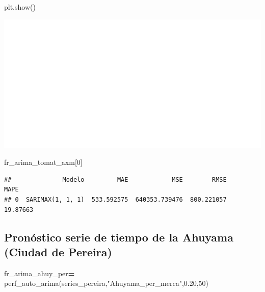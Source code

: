 \documentclass[
]{book}
\newenvironment{Shaded}{\begin{snugshade}}{\end{snugshade}}
\newcommand{\DecValTok}[1]{\textcolor[rgb]{0.00,0.00,0.81}{#1}}
\newcommand{\FloatTok}[1]{\textcolor[rgb]{0.00,0.00,0.81}{#1}}
\newcommand{\NormalTok}[1]{#1}
\newcommand{\OperatorTok}[1]{\textcolor[rgb]{0.81,0.36,0.00}{\textbf{#1}}}
\newcommand{\StringTok}[1]{\textcolor[rgb]{0.31,0.60,0.02}{#1}}
\begin{document}
\begin{Shaded}
\begin{Highlighting}[]
\NormalTok{plt.show()}
\end{Highlighting}
\end{Shaded}

\includegraphics{bookdown-demo_files/figure-latex/unnamed-chunk-158-150.pdf}

\begin{Shaded}
\begin{Highlighting}[]

\NormalTok{fr\_arima\_tomat\_axm[}\DecValTok{0}\NormalTok{]}
\end{Highlighting}
\end{Shaded}

\begin{verbatim}
##              Modelo         MAE            MSE        RMSE      MAPE
## 0  SARIMAX(1, 1, 1)  533.592575  640353.739476  800.221057  19.87663
\end{verbatim}

\hypertarget{pronuxf3stico-serie-de-tiempo-de-la-ahuyama-ciudad-de-pereira-1}{%
\subsection{Pronóstico serie de tiempo de la Ahuyama (Ciudad de Pereira)}\label{pronuxf3stico-serie-de-tiempo-de-la-ahuyama-ciudad-de-pereira-1}}

\begin{Shaded}
\begin{Highlighting}[]

\NormalTok{fr\_arima\_ahuy\_per}\OperatorTok{=}\NormalTok{ perf\_auto\_arima(series\_pereira,}\StringTok{"Ahuyama\_per\_merca"}\NormalTok{,}\FloatTok{0.20}\NormalTok{,}\DecValTok{50}\NormalTok{)}
\end{Highlighting}
\end{Shaded}
\end{document}
